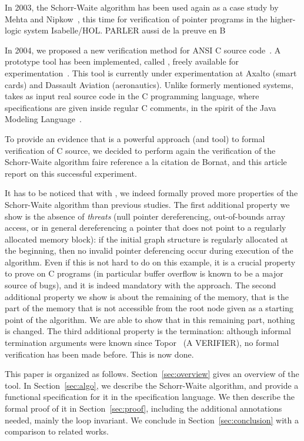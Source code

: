 In 2003, the Schorr-Waite algorithm has been used again as a case
study by Mehta and Nipkow~\cite{mehta03cade}, this time for
verification of pointer programs in the higher-logic system
Isabelle/HOL. PARLER aussi de la preuve en B

In 2004, we proposed a new verification method for ANSI
C source code~\cite{filliatre04icfem}.  A prototype tool has been
implemented, called \caduceus{}, freely available for
experimentation~\cite{Caduceus}. This tool is currently under
experimentation at Axalto (smart cards) and Dassault Aviation
(aeronautics). Unlike formerly mentioned systems, \caduceus{} takes as
input real source code in the C programming language, where
specifications are given inside regular C comments, in the spirit of
the Java Modeling Language~\cite{leavens00jml}. 

To provide an evidence that \caduceus{} is a powerful approach (and
tool) to formal verification of C source, we decided to perform again
the verification of the Schorr-Waite algorithm {\huge faire reference
  a la citation de Bornat}, and this article report
on this successful experiment.

It has to be noticed that with \caduceus{}, we indeed formally proved
more properties of the Schorr-Waite algorithm than previous studies.
The first additional property we show is the absence of \emph{threats}
(null pointer dereferencing, out-of-bounds array access, or in general
dereferencing a pointer that does not point to a regularly allocated
memory block): if the initial graph structure is regularly allocated
at the beginning, then no invalid pointer deferencing occur during
execution of the algorithm. Even if this is not hard to do on this
example, it is a crucial property to prove on C programs (in
particular buffer overflow is known to be a major source of bugs), and
it is indeed mandatory with the \caduceus{} approach. The second
additional property we show is about the remaining of the memory, that
is the part of the memory that is not accessible from the root node
given as a starting point of the algorithm. We are able to show that
in this remaining part, nothing is changed. The third additional
property is the termination: although informal termination arguments
were known since Topor~\cite{topor79acta} (A VERIFIER), no formal
verification has been made before. This is now done.

This paper is organized as follows.  Section~\ref{sec:overview} gives
an overview of the \caduceus{} tool.  In Section~\ref{sec:algo}, we
describe the Schorr-Waite algorithm, and provide a functional
specification for it in the \caduceus{} specification language.
We then describe the formal proof of it in Section~\ref{sec:proof},
including the additional annotations needed, mainly the loop
invariant.  We conclude in Section~\ref{sec:conclusion} with a
comparison to related works.





